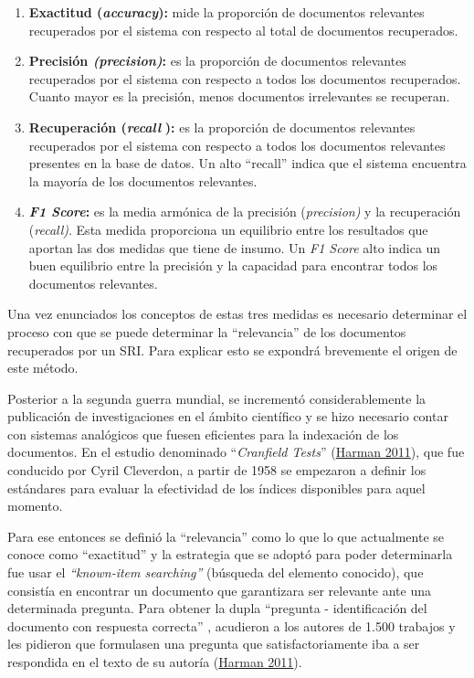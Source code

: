\documentclass[
  12pt,
  openany]{book}
\begin{document}
\begin{enumerate}
\def\labelenumi{\arabic{enumi}.}
\item
  \textbf{Exactitud (\emph{accuracy}):} mide la proporción de documentos relevantes recuperados por el sistema con respecto al total de documentos recuperados.
\item
  \textbf{Precisión \emph{(precision)}:} es la proporción de documentos relevantes recuperados por el sistema con respecto a todos los documentos recuperados. Cuanto mayor es la precisión, menos documentos irrelevantes se recuperan.
\item
  \textbf{Recuperación (\emph{recall}} \textbf{):} es la proporción de documentos relevantes recuperados por el sistema con respecto a todos los documentos relevantes presentes en la base de datos. Un alto ``recall'' indica que el sistema encuentra la mayoría de los documentos relevantes.
\item
  \textbf{\emph{F1 Score}:} es la media armónica de la precisión (\emph{precision)} y la recuperación (\emph{recall)}. Esta medida proporciona un equilibrio entre los resultados que aportan las dos medidas que tiene de insumo. Un \emph{F1 Score} alto indica un buen equilibrio entre la precisión y la capacidad para encontrar todos los documentos relevantes.
\end{enumerate}

Una vez enunciados los conceptos de estas tres medidas es necesario determinar el proceso con que se puede determinar la ``relevancia'' de los documentos recuperados por un SRI. Para explicar esto se expondrá brevemente el origen de este método.

Posterior a la segunda guerra mundial, se incrementó considerablemente la publicación de investigaciones en el ámbito científico y se hizo necesario contar con sistemas analógicos que fuesen eficientes para la indexación de los documentos. En el estudio denominado ``\emph{Cranfield Tests}'' (\protect\hyperlink{ref-harman2011}{Harman 2011}), que fue conducido por Cyril Cleverdon, a partir de 1958 se empezaron a definir los estándares para evaluar la efectividad de los índices disponibles para aquel momento.

Para ese entonces se definió la ``relevancia'' como lo que lo que actualmente se conoce como ``exactitud'' y la estrategia que se adoptó para poder determinarla fue usar el \emph{``known-item searching''} (búsqueda del elemento conocido), que consistía en encontrar un documento que garantizara ser relevante ante una determinada pregunta. Para obtener la dupla ``pregunta - identificación del documento con respuesta correcta'' , acudieron a los autores de 1.500 trabajos y les pidieron que formulasen una pregunta que satisfactoriamente iba a ser respondida en el texto de su autoría (\protect\hyperlink{ref-harman2011}{Harman 2011}).
\end{document}
